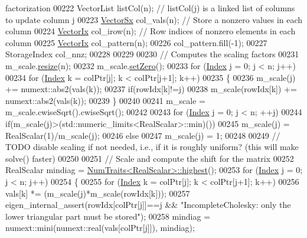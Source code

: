 \begin{DoxyCode}
{       factorization}
00222   VectorList listCol(n);  \textcolor{comment}{// listCol(j) is a linked list of columns to update column j}
00223   \hyperlink{group___core___module}{VectorSx} col\_vals(n);   \textcolor{comment}{// Store a  nonzero values in each column}
00224   \hyperlink{group___core___module}{VectorIx} col\_irow(n);   \textcolor{comment}{// Row indices of nonzero elements in each column}
00225   \hyperlink{group___core___module}{VectorIx} col\_pattern(n);
00226   col\_pattern.fill(-1);
00227   StorageIndex col\_nnz;
00228   
00229   
00230   \textcolor{comment}{// Computes the scaling factors }
00231   m\_scale.\hyperlink{class_eigen_1_1_plain_object_base_a99d9054ee2d5a40c6e00ded0265e9cea}{resize}(n);
00232   m\_scale.\hyperlink{class_eigen_1_1_plain_object_base_ac21ad5f989f320e46958b75ac8d9a1da}{setZero}();
00233   \textcolor{keywordflow}{for} (\hyperlink{namespace_eigen_a62e77e0933482dafde8fe197d9a2cfde}{Index} j = 0; j < n; j++)
00234     \textcolor{keywordflow}{for} (\hyperlink{namespace_eigen_a62e77e0933482dafde8fe197d9a2cfde}{Index} k = colPtr[j]; k < colPtr[j+1]; k++)
00235     \{
00236       m\_scale(j) += numext::abs2(vals(k));
00237       \textcolor{keywordflow}{if}(rowIdx[k]!=j)
00238         m\_scale(rowIdx[k]) += numext::abs2(vals(k));
00239     \}
00240   
00241   m\_scale = m\_scale.cwiseSqrt().cwiseSqrt();
00242 
00243   \textcolor{keywordflow}{for} (\hyperlink{namespace_eigen_a62e77e0933482dafde8fe197d9a2cfde}{Index} j = 0; j < n; ++j)
00244     \textcolor{keywordflow}{if}(m\_scale(j)>(std::numeric\_limits<RealScalar>::min)())
00245       m\_scale(j) = RealScalar(1)/m\_scale(j);
00246     \textcolor{keywordflow}{else}
00247       m\_scale(j) = 1;
00248 
00249   \textcolor{comment}{// TODO disable scaling if not needed, i.e., if it is roughly uniform? (this will make solve() faster)}
00250   
00251   \textcolor{comment}{// Scale and compute the shift for the matrix }
00252   RealScalar mindiag = \hyperlink{group___core___module_struct_eigen_1_1_num_traits}{NumTraits<RealScalar>::highest}();
00253   \textcolor{keywordflow}{for} (\hyperlink{namespace_eigen_a62e77e0933482dafde8fe197d9a2cfde}{Index} j = 0; j < n; j++)
00254   \{
00255     \textcolor{keywordflow}{for} (\hyperlink{namespace_eigen_a62e77e0933482dafde8fe197d9a2cfde}{Index} k = colPtr[j]; k < colPtr[j+1]; k++)
00256       vals[k] *= (m\_scale(j)*m\_scale(rowIdx[k]));
00257     eigen\_internal\_assert(rowIdx[colPtr[j]]==j && \textcolor{stringliteral}{"IncompleteCholesky: only the lower triangular part must
       be stored"});
00258     mindiag = numext::mini(numext::real(vals[colPtr[j]]), mindiag);

\end{DoxyCode}

